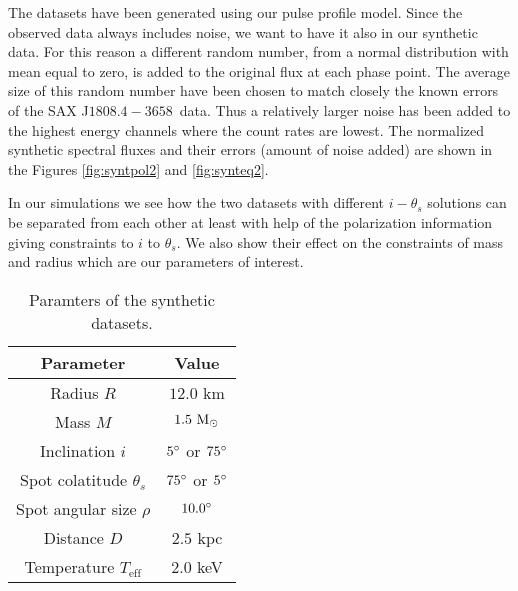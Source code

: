 \documentclass{wihuri}
\def\msun{{\rm M_{\odot}}}
\def\source{SAX J$1808.4-3658$}
\def\thetas{\theta_{s}}
\begin{document}
The datasets have been generated using our pulse profile model. Since the observed data always includes noise, we want to have it also in our synthetic data. For this reason a different random number, from a normal distribution with mean equal to zero, is added to the original flux at each phase point. The average size of this random number have been chosen to match closely the known errors of the \source \ data. Thus a relatively larger noise has been added to the highest energy channels where the count rates are lowest. The normalized synthetic spectral fluxes and their errors (amount of noise added) are shown in the Figures \ref{fig:syntpol2} and \ref{fig:synteq2}.





In our simulations we see how the two datasets with different $i-\thetas$ solutions can be separated from each other at least with help of the polarization information giving constraints to $i$ to $\thetas$. We also show their effect on the constraints of mass and radius which are our parameters of interest. 




\begin{center}
\begin{table}
  \caption{Paramters of the synthetic datasets.}
\label{table:params}
\begin{center}
  \begin{tabular}{| c | c |}
    \hline
     Parameter & Value\\ \hline
      Radius $R$ & $12.0$ km  \\ \hline
      Mass $M$ & $1.5 ~\msun$  \\ \hline
      Inclination $i$ & $5 \degree$ or $75 \degree$ \\ \hline
      Spot colatitude $\thetas$ & $75 \degree$ or $5 \degree$ \\ \hline
      Spot angular size $\rho$ & $10.0 \degree$  \\ \hline
      Distance $D$ & $2.5$ kpc \\ \hline
      Temperature $T_{\mathrm{eff}}$ & $2.0$ keV \\

    \hline
  \end{tabular}
  \end{center} 

  \end{table}
\end{center} 
\end{document}
